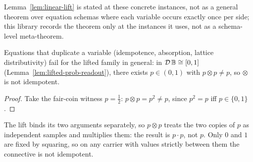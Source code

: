Lemma~\ref{lem:linear-lift} is stated at these concrete instances, not
as a general theorem over equation schemas where each variable occurs
exactly once per side; this library records the theorem only at the
instances it uses, not as a schema-level meta-theorem.

\begin{lemma}
\label{lem:copying-fails}
\leanok
Equations that duplicate a variable (idempotence, absorption, lattice
distributivity) fail for the lifted family in general: in
$\mathcal D\,\mathbb B \cong [0,1]$ (Lemma~\ref{lem:lifted-prob-readout}),
there exists $p \in (0,1)$ with $p \otimes p \ne p$, so $\otimes$ is not
idempotent.
\end{lemma}

\begin{proof}
\leanok
Take the fair-coin witness $p=\tfrac12$: $p \otimes p = p^2 \ne p$, since
$p^2=p$ iff $p\in\{0,1\}$.
\end{proof}

The lift binds its two arguments separately, so $p \otimes p$ treats
the two copies of $p$ as independent samples and multiplies them: the
result is $p \cdot p$, not $p$. Only $0$ and $1$ are fixed by squaring,
so on any carrier with values strictly between them the connective is
not idempotent.

